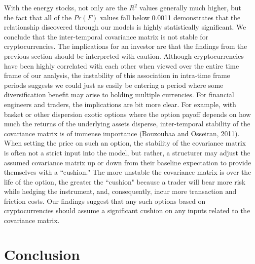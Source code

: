 \documentclass[12pt,twoside]{article}
\begin{document}
With the energy stocks, not only are the $R^2$ values generally much higher, but the fact that all of the $Pr(F)$ values fall below 0.0011 demonstrates that the relationship discovered through our models is highly statistically significant. We conclude that the inter-temporal covariance matrix is not stable for cryptocurrencies. The implications for an investor are that the findings from the previous section should be interpreted with caution. Although cryptocurrencies have been highly correlated with each other when viewed over the entire time frame of our analysis, the instability of this association in intra-time frame periods suggests we could just as easily be entering a period where some diversification benefit may arise to holding multiple currencies.
\bigbreak
For financial engineers and traders, the implications are bit more clear. For example, with basket or other dispersion exotic options where the option payoff depends on how much the returns of the underlying assets disperse, inter-temporal stability of the covariance matrix is of immense importance (Bouzoubaa and Osseiran, 2011). When setting the price on such an option, the stability of the covariance matrix is often not a strict input into the model, but rather, a structurer may adjust the assumed covariance matrix up or down from their baseline expectation to provide themselves with a ``cushion." The more unstable the covariance matrix is over the life of the option, the greater the ``cushion" because a trader will bear more risk while hedging the instrument, and, consequently, incur more transaction and friction costs. Our findings suggest that any such options based on cryptocurrencies should assume a significant cushion on any inputs related to the covariance matrix.

\section{Conclusion}
\end{document}
